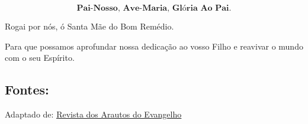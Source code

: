 \documentclass[a4paper,14pt]{extarticle} \usepackage[utf8]{inputenc}
\makeatletter
\newcommand{\vers@resp@sym}{%
  \raisebox{0.2ex}{\rotatebox[origin=c]{-20}{$\m@th\rceil$}}%
}
\newcommand{\vers@resp}[2]{%
  {\ooalign{%
     \hidewidth\kern#1\vers@resp@sym\hidewidth\cr
     #2\cr
  }}%
}
\DeclareRobustCommand{\versicle}{\vers@resp{-0.1em}{V}}
\DeclareRobustCommand{\response}{\vers@resp{0pt}{R}}
\makeatother
\begin{document}
\[
  \textbf{Pai-Nosso, Ave-Maria, Glória Ao Pai.}
\]

\response Rogai por nós, ó Santa Mãe do Bom Remédio.

\versicle Para que possamos aprofundar nossa dedicação ao vosso Filho e reavivar o mundo com o seu Espírito. 


\vfill

\begin{center}
\subsection*{Fontes:}
Adaptado de: \underline{\href{https://revista.arautos.org/mae-do-bom-remedio-remedio-para-todas-as-aflicoes/}{Revista dos Arautos do Evangelho}}
\end{center}
\end{document}
